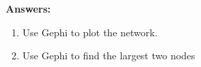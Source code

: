 \documentclass{amsart}
\theoremstyle{definition}
\theoremstyle{remark}
\numberwithin{equation}{section}
\begin{document}
\begin{enumerate}
\vspace{0.5cm}

\textbf{Answers:}

\begin{enumerate}
\item Use Gephi to plot the network. \vspace{0.2cm}

\vspace{0.2cm}
\item Use Gephi to find the largest two nodes \vspace{0.2cm}

\vspace{0.2cm}
\end{enumerate}


\end{enumerate}
\end{document}
